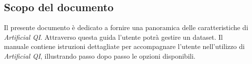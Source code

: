 \subsection{Scopo del documento}
Il presente documento è dedicato a fornire una panoramica delle caratteristiche di \textit{Artificial QI}. Attraverso questa guida l’utente potrà gestire un dataset.
Il manuale contiene istruzioni dettagliate per accompagnare l’utente nell’utilizzo di \textit{Artificial QI}, illustrando passo dopo passo le opzioni disponibili.